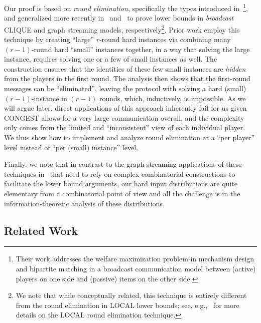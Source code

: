 \documentclass[11pt]{article}
\theoremstyle{definition}
\begin{document}
Our proof is based on \emph{round elimination}, specifically the types introduced in~\cite{AlonNRW15}\footnote{\label{footnote:welfare} Their work addresses the welfare maximization problem in mechanism design and bipartite matching in a broadcast communication model between (active) players on
	one side and (passive) items on the other side.}, and generalized more recently in~\cite{AssadiKZ22} and~\cite{AssadiKNS24,AssadiBKNS25} to prove lower bounds in
\emph{broadcast} CLIQUE and graph streaming models, respectively\footnote{We note that while conceptually related, this technique is entirely different from the round elimination in LOCAL lower bounds; see, e.g.,~\cite{Suomela20} for
	more details on the LOCAL round elimination technique.}. Prior work employ this technique by creating ``large'' $r$-round hard instances via combining many $(r-1)$-round hard ``small'' instances together, in a way that solving the large instance, requires solving one or a few of small instances as well. The construction ensures that
the identities of these few small instances are \emph{hidden} from the players in the first round. The analysis then shows that the first-round messages can be ``eliminated'', 
leaving the protocol with solving a hard (small) $(r-1)$-instance in $(r-1)$ rounds, which, inductively, is impossible. As we will argue later, direct applications of this approach inherently fail for us given CONGEST allows for a very large communication overall, and the complexity only comes from the limited and ``inconsistent'' view of each individual player. We thus show how to implement and analyze round elimination at a ``per player'' level instead of ``per (small) instance'' level. 

Finally, we note that in contrast to the graph streaming applications of these techniques in~\cite{AssadiKNS24,AssadiBKNS25} that need to rely on complex combinatorial constructions to facilitate 
the lower bound arguments, our hard input distributions are quite elementary from a combinatorial point of view and all the challenge is in the information-theoretic analysis of these distributions. 

\subsection{Related Work}\label{sec:related}
\end{document}
